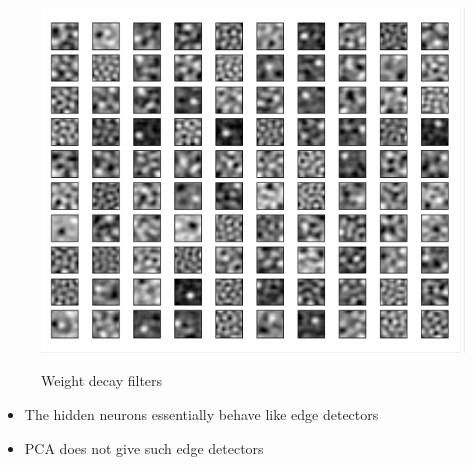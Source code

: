 \begin{frame}
\begin{figure}
        \includegraphics[width=\linewidth]{images/weight-decay.png}
        \label{fig:awesome_image3}
        \caption{Weight decay filters}
    \endminipage
    \label{pics:blablabla}
    \end{figure}

    \begin{itemize}\justifying
        \item<1-> The hidden neurons essentially behave like edge detectors
        \item<2-> PCA does not give such edge detectors
    \end{itemize}
\end{frame}


